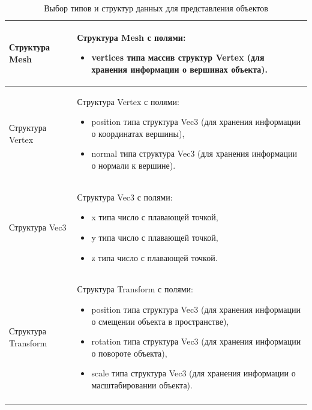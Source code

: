 \begin{longtable}{|p{}|p{}|}
        \hline
        Структура Mesh
        &
        Структура Mesh с полями:
        \begin{itemize}
            \item vertices типа массив структур Vertex (для хранения информации о вершинах объекта).
        \end{itemize}
        \\
        \hline
        Структура Vertex
        &
        Структура Vertex с полями:
        \begin{itemize}
            \item position типа структура Vec3 (для хранения информации о координатах вершины),
            \item normal типа структура Vec3 (для хранения информации о нормали к вершине).
        \end{itemize}
        \\
        \hline
        Структура Vec3
        &
        Структура Vec3 с полями:
        \begin{itemize}
            \item x типа число с плавающей точкой,
            \item y типа число с плавающей точкой,
            \item z типа число с плавающей точкой.
        \end{itemize}
        \\
        \hline
        Структура Transform
        &
        Структура Transform с полями:
        \begin{itemize}
            \item position типа структура Vec3 (для хранения информации о смещении объекта в пространстве),
            \item rotation типа структура Vec3 (для хранения информации о повороте объекта),
            \item scale типа структура Vec3 (для хранения информации о масштабировании объекта).
        \end{itemize}
        \\
        \hline

        \hline
        \newpage
        \caption{Выбор типов и структур данных для представления объектов} \vspace{0.3cm} \\


\end{longtable}
